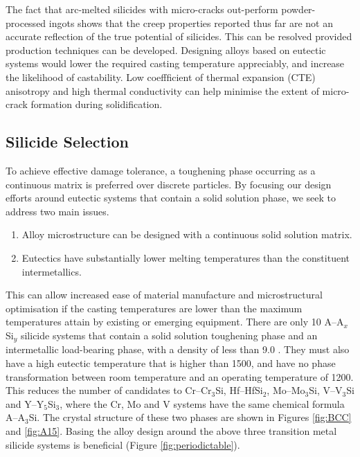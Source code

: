 The fact that arc-melted silicides with micro-cracks out-perform powder-processed ingots shows that the creep properties reported thus far are not an accurate reflection of the true potential of silicides.  This can be resolved provided production techniques can be developed. Designing alloys based on eutectic systems would lower the required casting temperature appreciably, and increase the likelihood of castability.  Low coeffficient of thermal expansion (CTE) anisotropy and high thermal conductivity can help minimise the extent of micro-crack formation during solidification.


\subsection{Silicide Selection}

To achieve effective damage tolerance, a toughening phase occurring as a continuous matrix is preferred over discrete particles.  By focusing our design efforts around eutectic systems that contain a solid solution phase, we seek to address two main issues.
\begin{enumerate}
\item Alloy microstructure can be designed with a continuous solid solution matrix.  \item Eutectics have substantially lower melting temperatures than the constituent intermetallics.
\end{enumerate}  
  This can allow increased ease of material manufacture and microstructural optimisation if the casting temperatures are lower than the maximum temperatures attain by existing or emerging equipment. There are only 10 A--A$_x$Si$_y$ silicide systems that contain a solid solution toughening phase and an intermetallic load-bearing phase, with a density of less than 9.0 \gram\usk\centi\rpcubic\metre. They must also have a high eutectic temperature that is higher than 1500\celsius, and have no phase transformation between room temperature and an operating temperature of 1200\celsius.  This reduces the number of candidates to Cr--Cr$_3$Si, Hf--HfSi$_2$, Mo--Mo$_3$Si, V--V$_3$Si and Y--Y$_5$Si$_3$, where the Cr, Mo and V systems have the same chemical formula A--A$_3$Si. The crystal structure of these two phases are shown in Figures \ref{fig:BCC} and \ref{fig:A15}. Basing the alloy design around the above three transition metal silicide systems is beneficial (Figure \ref{fig:periodictable}). 
%
